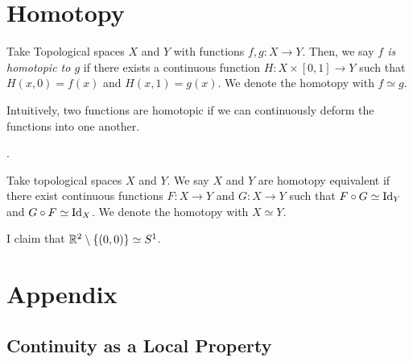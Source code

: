 \documentclass[../sean_thesis.tex]{subfiles}
\begin{document}

\section{Homotopy}

\begin{definition}
	Take Topological spaces $X$ and $Y$ with functions $f,g:X \to Y$. Then, we say \emph{$f$ is homotopic to $g$} if there exists a continuous function $H: X \times [0,1] \to Y$ such that $H(x,0) = f(x)$ and $H(x,1) = g(x)$. We denote the homotopy with $f \simeq g$.
\end{definition}
Intuitively, two functions are homotopic if we can continuously deform the functions into one another. 

.

\begin{definition}
	Take topological spaces $X$ and $Y$. We say $X$ and $Y$ are homotopy equivalent if there exist continuous functions $F:X \to Y$ and $G:X \to Y$ such that $F \circ G \simeq \operatorname{Id}_Y$ and $G \circ F \simeq \operatorname{Id}_X$. We denote the homotopy with $X \simeq Y$.
\end{definition}



\begin{example}
	I claim that $\mathbb{R}^2 \setminus \left\{(0,0)\right\} \simeq S^1$.
\end{example}

\section{Appendix}
\subsection{Continuity as a Local Property}~

\end{document}
